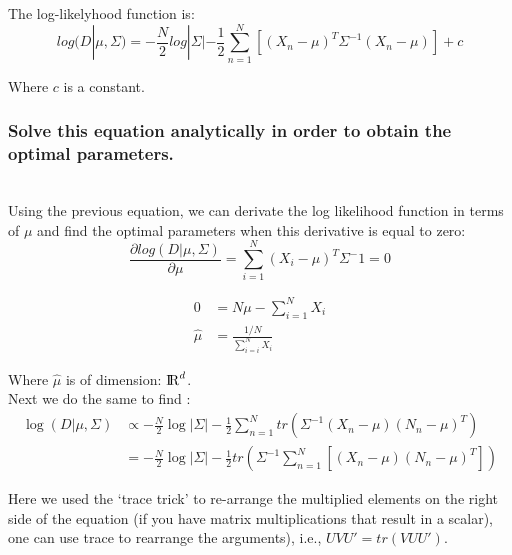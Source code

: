 \documentclass{amsart}
\theoremstyle{definition}
\theoremstyle{remark}
\numberwithin{equation}{section}
\begin{document}
The log-likelyhood function is: \\

\begin{equation}
    log(D|\mu,\Sigma) = -\frac{N}{2}log|\Sigma| -\frac{1}{2} 
        \sum_{n=1}^{N} [(X_n - \mu)^T \Sigma^{-1} (X_n - \mu)] + c
\end{equation}

Where $c$ is a constant. \\

\subsubsection{Solve this equation analytically in order to obtain the optimal
parameters.} \\

Using the previous equation, we can derivate the log likelihood function in terms of 
$\mu$ and find the optimal parameters when this derivative is equal to zero: \\

\begin{equation}
    \frac{\partial log (D | \mu, \Sigma)}{\partial\mu} = 
        \sum_{i=1}^{N}(X_i-\mu)^T \Sigma^-1 = 0 
\end{equation}


\begin{equation}
    \begin{align}
    0 &= N \mu - \sum_{i=1}^{N}X_i \\
    \hat\mu & = \frac{1/N}{\sum_{i=i}^{N}X_i}
    \end{align}
\end{equation}

Where $\hat\mu$ is of dimension: ${\rm I\!R}^d$. \\

Next we do the same to find \hat{\Sigma}: \\

\begin{equation}
    \begin{align}
    \log (D | \mu, \Sigma) & \propto -\frac{N}{2} \log|\Sigma| -\frac{1}{2} \sum_{n=1}^{N} tr(\Sigma^{-1}(X_n-\mu)(N_n-\mu)^T) \\
    & = -\frac{N}{2} \log|\Sigma| -\frac{1}{2}tr(\Sigma^{-1} \sum_{n=1}^{N} [(X_n-\mu)(N_n-\mu)^T])
    \end{align}
\end{equation}

Here we used the `trace trick' to re-arrange the multiplied elements on the right
side of the equation (if you have matrix multiplications that result in a scalar),
one can use trace to rearrange the arguments), i.e., $UVU' = tr(VUU')$. \\
\end{document}
